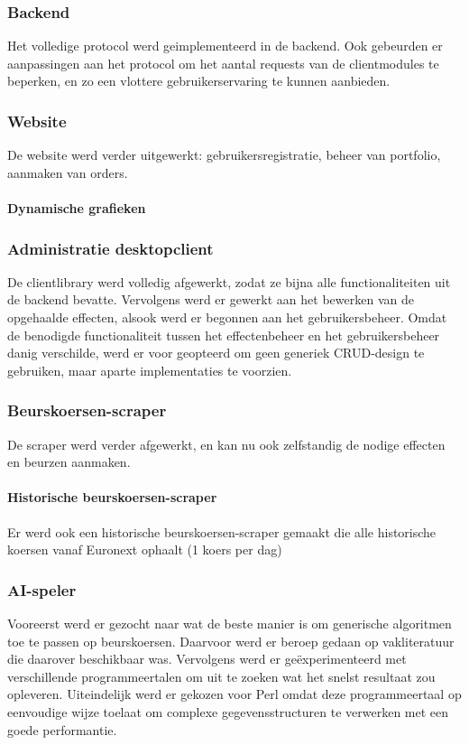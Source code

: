 \subsubsection{Backend}
Het volledige protocol werd geimplementeerd in de backend. Ook gebeurden er aanpassingen aan het protocol om het aantal requests van de clientmodules te beperken, en zo een vlottere gebruikerservaring te kunnen aanbieden.

\subsubsection{Website}
De website werd verder uitgewerkt: gebruikersregistratie, beheer van portfolio, aanmaken van orders.
\paragraph{Dynamische grafieken}

\subsubsection{Administratie desktopclient}
De clientlibrary werd volledig afgewerkt, zodat ze bijna alle functionaliteiten uit de backend bevatte.
Vervolgens werd er gewerkt aan het bewerken van de opgehaalde effecten, alsook werd er begonnen aan het gebruikersbeheer. Omdat de benodigde functionaliteit tussen het effectenbeheer en het gebruikersbeheer danig verschilde, werd er voor geopteerd om geen generiek CRUD-design te gebruiken, maar aparte implementaties te voorzien.

\subsubsection{Beurskoersen-scraper}
De scraper werd verder afgewerkt, en kan nu ook zelfstandig de nodige effecten en beurzen aanmaken.
\paragraph{Historische beurskoersen-scraper}
Er werd ook een historische beurskoersen-scraper gemaakt die alle historische koersen vanaf Euronext ophaalt (1 koers per dag)

\subsubsection{AI-speler}
Vooreerst werd er gezocht naar wat de beste manier is om generische algoritmen toe te passen op beurskoersen. Daarvoor werd er beroep gedaan op vakliteratuur die daarover beschikbaar was. Vervolgens werd er ge\"experimenteerd met verschillende programmeertalen om uit te zoeken wat het snelst resultaat zou opleveren. Uiteindelijk werd er gekozen voor Perl omdat deze programmeertaal op eenvoudige wijze toelaat om complexe gegevensstructuren te verwerken met een goede performantie.

